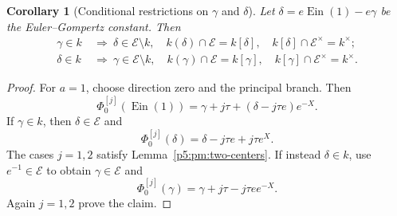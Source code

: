 \documentclass[11pt,a4paper]{article}
\newtheorem{corollary}[theorem]{Corollary}
\theoremstyle{definition}
\theoremstyle{remark}
\numberwithin{equation}{section}
\begin{document}
\begin{corollary}[Conditional restrictions on $\gamma$ and $\delta$]
\label{p5:pm:gamma-delta}
Let $\delta=e\operatorname{Ein}(1)-e\gamma$ be the Euler--Gompertz
constant.  Then
\begin{align*}
 \gamma\in k&\ \Longrightarrow\ 
 \delta\in\mathcal E\setminus k,\quad
 k(\delta)\cap\mathcal E=k[\delta],\quad
 k[\delta]\cap\mathcal E^\times=k^\times;\\
 \delta\in k&\ \Longrightarrow\ 
 \gamma\in\mathcal E\setminus k,\quad
 k(\gamma)\cap\mathcal E=k[\gamma],\quad
 k[\gamma]\cap\mathcal E^\times=k^\times.
\end{align*}
\end{corollary}
\begin{proof}
For $a=1$, choose direction zero and the principal branch.  Then
\[
 \Phi_0^{[j]}(\operatorname{Ein}(1))
    =\gamma+j\tau+(\delta-j\tau e)e^{-X}.
\]
If $\gamma\in k$, then $\delta\in\mathcal E$ and
\[
 \Phi_0^{[j]}(\delta)=\delta-j\tau e+j\tau e^X.
\]
The cases $j=1,2$ satisfy Lemma~\ref{p5:pm:two-centers}.
If instead $\delta\in k$, use $e^{-1}\in\mathcal E$ to obtain
$\gamma\in\mathcal E$ and
\[
 \Phi_0^{[j]}(\gamma)=\gamma+j\tau-j\tau e e^{-X}.
\]
Again $j=1,2$ prove the claim.
\end{proof}
\end{document}
